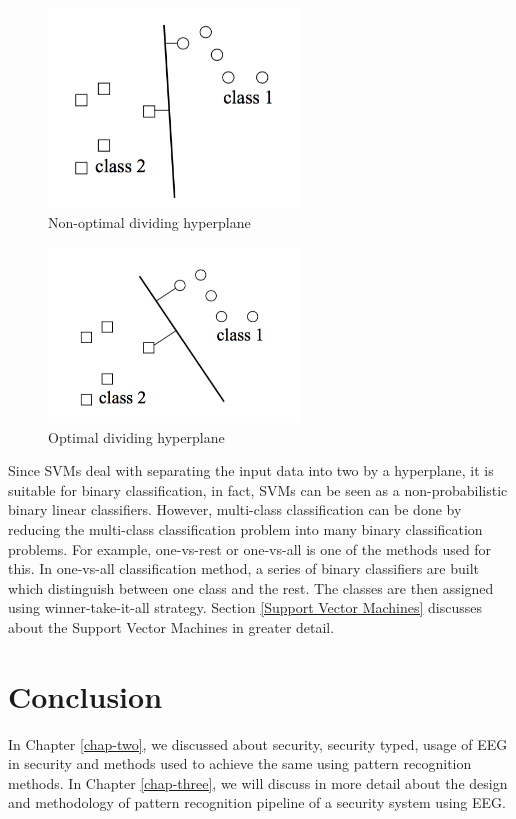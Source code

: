         \begin{figure}[hbtp]
            \centering
            \includegraphics[width=0.6\textwidth]{Chapter-2/badsvm}
            \caption{Non-optimal dividing hyperplane \cite{snyder2010machine}}
            \label{fig:badsvm}
  		\end{figure}
        \begin{figure}[hbtp]
            \centering
            \includegraphics[width=0.6\textwidth]{Chapter-2/goodsvm}
            \caption{Optimal dividing hyperplane \cite{snyder2010machine}}
            \label{fig:goodsvm}
  		\end{figure} 
        
        Since SVMs deal with separating the input data into two by a hyperplane, it is suitable for binary classification, in fact, SVMs can be seen as a non-probabilistic binary linear classifiers. However, multi-class classification can be done by reducing the multi-class classification problem into many binary classification problems. For example, one-vs-rest or one-vs-all is one of the methods used for this. In one-vs-all classification method, a series of binary classifiers are built which distinguish between one class and the rest. The classes are then assigned using winner-take-it-all strategy. Section \ref{Support Vector Machines} discusses about the Support Vector Machines in greater detail.
        
        \section{Conclusion}
        	In Chapter \ref{chap-two}, we discussed about security, security typed, usage of EEG in security and methods used to achieve the same using pattern recognition methods. In Chapter \ref{chap-three}, we will discuss in more detail about the design and methodology of pattern recognition pipeline of a security system using EEG.
        